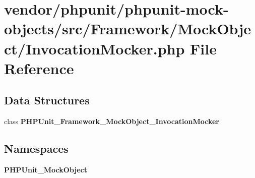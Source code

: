 \section{vendor/phpunit/phpunit-\/mock-\/objects/src/\+Framework/\+Mock\+Object/\+Invocation\+Mocker.php File Reference}
\label{_invocation_mocker_8php}
\subsection*{Data Structures}
\begin{DoxyCompactItemize}
\item 
class {\bf P\+H\+P\+Unit\+\_\+\+Framework\+\_\+\+Mock\+Object\+\_\+\+Invocation\+Mocker}
\end{DoxyCompactItemize}
\subsection*{Namespaces}
\begin{DoxyCompactItemize}
\item 
 {\bf P\+H\+P\+Unit\+\_\+\+Mock\+Object}
\end{DoxyCompactItemize}
